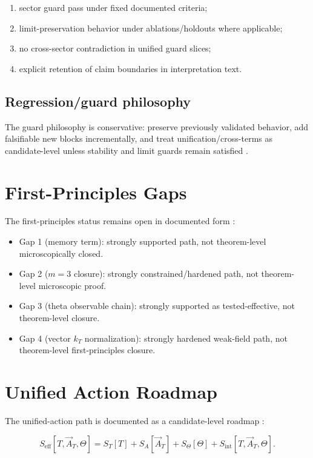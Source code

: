 \documentclass[11pt,a4paper]{article}
\begin{document}
\begin{enumerate}
  \item sector guard pass under fixed documented criteria;
  \item limit-preservation behavior under ablations/holdouts where applicable;
  \item no cross-sector contradiction in unified guard slices;
  \item explicit retention of claim boundaries in interpretation text.
\end{enumerate}

\subsection{Regression/guard philosophy}

The guard philosophy is conservative: preserve previously validated behavior, add falsifiable new blocks incrementally, and treat unification/cross-terms as candidate-level unless stability and limit guards remain satisfied \cite{unified_action_roadmap}.

\section{First-Principles Gaps}

The first-principles status remains open in documented form \cite{gap_list}:

\begin{itemize}
  \item Gap 1 (memory term): strongly supported path, not theorem-level microscopically closed.
  \item Gap 2 (\(m=3\) closure): strongly constrained/hardened path, not theorem-level microscopic proof.
  \item Gap 3 (theta observable chain): strongly supported as tested-effective, not theorem-level closure.
  \item Gap 4 (vector \(k_T\) normalization): strongly hardened weak-field path, not theorem-level first-principles closure.
\end{itemize}

\section{Unified Action Roadmap}

The unified-action path is documented as a candidate-level roadmap \cite{unified_action_roadmap}:

\[
S_{\mathrm{eff}}[T,\vec A_T,\Theta]
=
S_T[T]+S_A[\vec A_T]+S_\Theta[\Theta]
+S_{\mathrm{int}}[T,\vec A_T,\Theta].
\]
\end{document}

